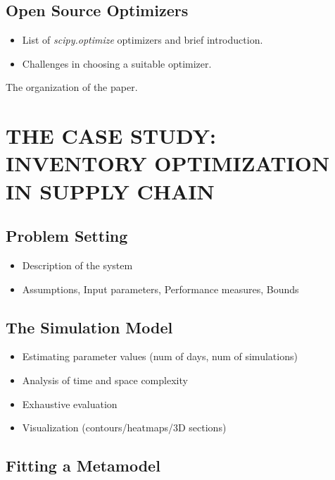 \subsection{Open Source Optimizers}
\begin{itemize}
    \item List of \textit{scipy.optimize} optimizers and brief introduction.
    \item Challenges in choosing a suitable optimizer.
\end{itemize}
The organization of the paper.
\section{\uppercase{The Case study: Inventory optimization in Supply Chain}}
\subsection{Problem Setting}
\begin{itemize}
    \item Description of the system
    \item Assumptions, Input parameters, Performance measures, Bounds
\end{itemize}

\subsection{The Simulation Model}
\begin{itemize}
    \item Estimating parameter values (num of days, num of simulations)
    \item Analysis of time and space complexity
    \item Exhaustive evaluation 
    \item Visualization (contours/heatmaps/3D sections)
\end{itemize}
\subsection{Fitting a Metamodel}

